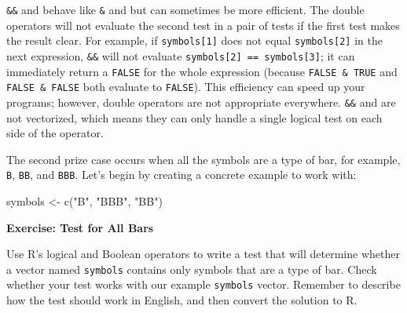 \documentclass[
  letterpaper,
  DIV=11,
  numbers=noendperiod]{scrbook}
\newenvironment{Shaded}{\begin{snugshade}}{\end{snugshade}}
\newcommand{\FunctionTok}[1]{\textcolor[rgb]{0.28,0.35,0.67}{#1}}
\newcommand{\NormalTok}[1]{\textcolor[rgb]{0.00,0.23,0.31}{#1}}
\newcommand{\OtherTok}[1]{\textcolor[rgb]{0.00,0.23,0.31}{#1}}
\newcommand{\StringTok}[1]{\textcolor[rgb]{0.13,0.47,0.30}{#1}}
\begin{document}
\begin{tcolorbox}[enhanced jigsaw, breakable, colback=white, colbacktitle=quarto-callout-note-color!10!white, arc=.35mm, bottomrule=.15mm, coltitle=black, left=2mm, rightrule=.15mm, colframe=quarto-callout-note-color-frame, leftrule=.75mm, opacitybacktitle=0.6, bottomtitle=1mm, toptitle=1mm, titlerule=0mm, opacityback=0, title=\textcolor{quarto-callout-note-color}{\faInfo}\hspace{0.5em}{Note}, toprule=.15mm]

\texttt{\&\&} and \texttt{\textbar{}\textbar{}} behave like \texttt{\&}
and \texttt{\textbar{}} but can sometimes be more efficient. The double
operators will not evaluate the second test in a pair of tests if the
first test makes the result clear. For example, if
\texttt{symbols{[}1{]}} does not equal \texttt{symbols{[}2{]}} in the
next expression, \texttt{\&\&} will not evaluate
\texttt{symbols{[}2{]}\ ==\ symbols{[}3{]}}; it can immediately return a
\texttt{FALSE} for the whole expression (because
\texttt{FALSE\ \&\ TRUE} and \texttt{FALSE\ \&\ FALSE} both evaluate to
\texttt{FALSE}). This efficiency can speed up your programs; however,
double operators are not appropriate everywhere. \texttt{\&\&} and
\texttt{\textbar{}\textbar{}} are not vectorized, which means they can
only handle a single logical test on each side of the operator.

\end{tcolorbox}

The second prize case occurs when all the symbols are a type of bar, for
example, \texttt{B}, \texttt{BB}, and \texttt{BBB}. Let's begin by
creating a concrete example to work with:

\begin{Shaded}
\begin{Highlighting}[]
\NormalTok{symbols }\OtherTok{\textless{}{-}} \FunctionTok{c}\NormalTok{(}\StringTok{"B"}\NormalTok{, }\StringTok{"BBB"}\NormalTok{, }\StringTok{"BB"}\NormalTok{)}
\end{Highlighting}
\end{Shaded}

\begin{tcolorbox}[enhanced jigsaw, left=2mm, breakable, colback=white, colframe=quarto-callout-color-frame, leftrule=.75mm, bottomrule=.15mm, arc=.35mm, opacityback=0, rightrule=.15mm, toprule=.15mm]

\vspace{-3mm}\textbf{Exercise: Test for All Bars}\vspace{3mm}

Use R's logical and Boolean operators to write a test that will
determine whether a vector named \texttt{symbols} contains only symbols
that are a type of bar. Check whether your test works with our example
\texttt{symbols} vector. Remember to describe how the test should work
in English, and then convert the solution to R.

\end{tcolorbox}
\end{document}
